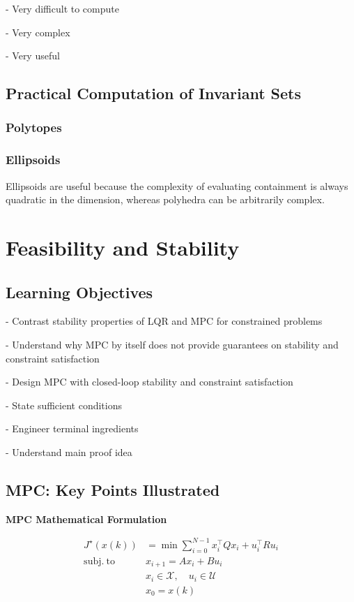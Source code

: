 - Very difficult to compute

- Very complex

- Very useful

\subsection{Practical Computation of Invariant Sets}

\subsubsection{Polytopes}
\subsubsection{Ellipsoids}

Ellipsoids are useful because the complexity of evaluating containment is always
quadratic in the dimension, whereas polyhedra can be arbitrarily complex.



\section{Feasibility and Stability}


\subsection{Learning Objectives}

- Contrast stability properties of LQR and MPC for constrained problems

- Understand why MPC by itself does not provide guarantees
on stability and constraint satisfaction

- Design MPC with closed-loop stability and constraint satisfaction

- State sufficient conditions

- Engineer terminal ingredients

- Understand main proof idea

\subsection{MPC: Key Points Illustrated}


\begin{sstTitleBox}[ForestGreen]{\textbf{\large
			MPC Mathematical Formulation
		}}

	\[\begin{aligned}
			J^\star(x(k))         & = \min \textstyle\sum_{i=0}^{N-1}
			x_i^\top Q x_i + u_i^\top R u_i                                        \\
			\mathrm{subj.\ to }\  & x_{i+1} = Ax_i + Bu_i                          \\
			                      & x_i \in \mathcal{X}, \quad u_i \in \mathcal{U} \\
			                      & x_0 = x(k)
		\end{aligned}\]

\end{sstTitleBox}

